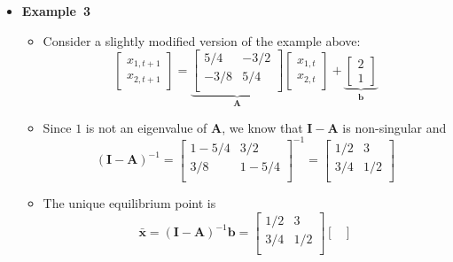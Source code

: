 \documentclass[12pt,a4paper]{article}
\begin{document}
\begin{itemize}
\item \textbf{Example~3}
  \begin{itemize}
  \item Consider a slightly modified version of the example above:
    \begin{equation}\nonumber%
      \begin{bmatrix}
        x_{1,t+1} \\
        x_{2,t+1}
      \end{bmatrix}
      =
      \underbrace{
      \begin{bmatrix}
        5/4 & -3/2 \\
        -3/8 & 5/4 \\
      \end{bmatrix}}_{\bm{A}}
      \begin{bmatrix}
        x_{1,t} \\
        x_{2,t}
      \end{bmatrix}
      +
      \underbrace{
      \begin{bmatrix}
        2 \\
        1
      \end{bmatrix}}_{\bm{b}}
    \end{equation}
  \item Since $1$ is not an eigenvalue of $\bm{A}$,
    we know that $\bm{I}-\bm{A}$ is non-singular and
    \begin{equation}\nonumber%
      (\bm{I}-\bm{A})^{-1} = 
      \begin{bmatrix}
        1-5/4 & 3/2 \\
        3/8 & 1-5/4 \\
      \end{bmatrix}^{-1}
      = 
      \begin{bmatrix}
        1/2 & 3 \\
        3/4 & 1/2 \\
      \end{bmatrix}
    \end{equation}
  \item The unique equilibrium point is
    \begin{equation}\nonumber%
      \bar{\bm{x}} =
      (\bm{I}-\bm{A})^{-1}\bm{b} =
      \begin{bmatrix}
        1/2 & 3 \\
        3/4 & 1/2 \\
      \end{bmatrix}
      \begin{bmatrix}

\end{bmatrix}
\end{equation}
\end{itemize}
\end{itemize}
\end{document}
